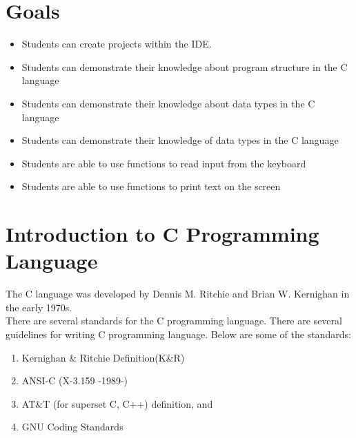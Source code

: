 \section{Goals}
\begin{itemize}[label=$\bullet$, itemsep=-1pt, leftmargin=*]
	\item Students can create projects within the IDE.
	\item Students can demonstrate their knowledge about program structure in the C language
	\item Students can demonstrate their knowledge about data types in the C language
	\item Students can demonstrate their knowledge of data types in the C language
	\item Students are able to use functions to read input from the keyboard
	\item Students are able to use functions to print text on the screen

\end{itemize}
\section{Introduction to C Programming Language}

The C language was developed by Dennis M. Ritchie and Brian W. Kernighan in the early 1970s.\\
There are several standards for the C programming language. There are several guidelines for writing C programming language. Below are some of the standards:
\begin{enumerate}
	\item Kernighan \& Ritchie Definition(K\&R)
	\item ANSI-C (X-3.159 -1989-)
	\item AT\&T (for superset C, C++) definition, and
	\item GNU Coding Standards
\end{enumerate}
